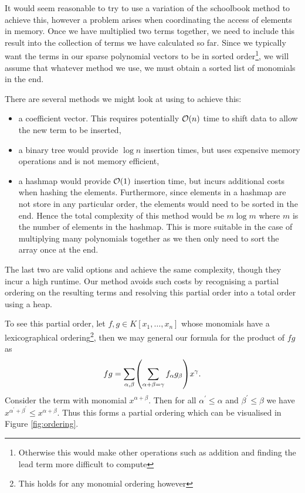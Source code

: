 It would seem reasonable to try to use a variation of the schoolbook method to achieve this, however a problem arises when coordinating the access of elements in memory. Once we have multiplied two terms together, we need to include this result into the collection of terms we have calculated so far. Since we typically want the terms in our sparse polynomial vectors to be in sorted order\footnote{Otherwise this would make other operations such as addition and finding the lead term more difficult to compute}, we will assume that whatever method we use, we must obtain a sorted list of monomials in the end.

There are several methods we might look at using to achieve this:
\begin{itemize}
    \item a coefficient vector. This requires potentially $\mathcal O(n)$ time to shift data to allow the new term to be inserted,
    \item a binary tree would provide $\log n$ insertion times, but uses expensive memory operations and is not memory efficient, 
    \item a hashmap would provide $\mathcal O(1)$ insertion time, but incurs additional costs when hashing the elements. Furthermore, since elements in a hashmap are not store in any particular order, the elements would need to be sorted in the end. Hence the total complexity of this method would be $m \log m$ where $m$ is the number of elements in the hashmap. This is more suitable in the case of multiplying many polynomials together as we then only need to sort the array once at the end.
\end{itemize}

The last two are valid options and achieve the same complexity, though they incur a high runtime. Our method avoids such costs by recognising a partial ordering on the resulting terms and resolving this partial order into a total order using a heap.

To see this partial order, let $f, g \in K[x_1, \ldots, x_n]$ whose monomials have a lexicographical ordering\footnote{This holds for any monomial ordering however}, then we may general our formula for the product of $fg$ as
\[
    fg = \sum_{\alpha, \beta} \bb{\sum_{\alpha + \beta = \gamma}f_\alpha g_\beta} x^{\gamma}.
\]
Consider the term with monomial $x^{\alpha + \beta}$. Then for all $ \alpha^\prime \le \alpha$ and $\beta^\prime \le \beta$ we have $x^{\alpha^\prime + \beta^\prime} \le x^{\alpha + \beta}$. Thus this forms a partial ordering which can be visualised in Figure \ref{fig:ordering}.


